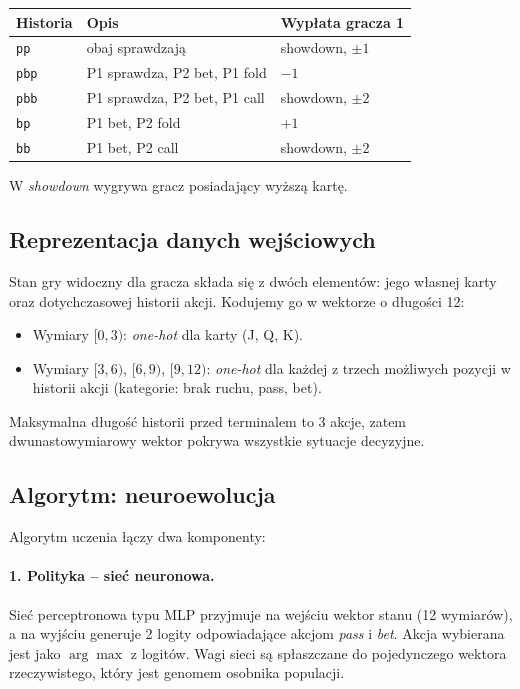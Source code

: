 \documentclass[12pt,a4paper]{article}
\begin{document}
\begin{center}
\begin{tabular}{lll}
\toprule
Historia & Opis & Wypłata gracza 1 \\ \midrule
\texttt{pp}  & obaj sprawdzają        & showdown, $\pm 1$ \\
\texttt{pbp} & P1 sprawdza, P2 bet, P1 fold & $-1$ \\
\texttt{pbb} & P1 sprawdza, P2 bet, P1 call & showdown, $\pm 2$ \\
\texttt{bp}  & P1 bet, P2 fold        & $+1$ \\
\texttt{bb}  & P1 bet, P2 call        & showdown, $\pm 2$ \\
\bottomrule
\end{tabular}
\end{center}

W \emph{showdown} wygrywa gracz posiadający wyższą kartę.

\subsection{Reprezentacja danych wejściowych}
Stan gry widoczny dla gracza składa się z dwóch elementów: jego własnej
karty oraz dotychczasowej historii akcji. Kodujemy go w wektorze o
długości 12:
\begin{itemize}
    \item Wymiary $[0,3)$: \emph{one-hot} dla karty (J, Q, K).
    \item Wymiary $[3,6)$, $[6,9)$, $[9,12)$: \emph{one-hot} dla każdej
          z trzech możliwych pozycji w historii akcji
          (kategorie: brak ruchu, pass, bet).
\end{itemize}
Maksymalna długość historii przed terminalem to 3 akcje, zatem
dwunastowymiarowy wektor pokrywa wszystkie sytuacje decyzyjne.

\subsection{Algorytm: neuroewolucja}
Algorytm uczenia łączy dwa komponenty:

\paragraph{1. Polityka -- sieć neuronowa.}
Sieć perceptronowa typu MLP przyjmuje na wejściu wektor stanu (12
wymiarów), a na wyjściu generuje 2 logity odpowiadające akcjom
\emph{pass} i \emph{bet}. Akcja wybierana jest jako $\arg\max$ z logitów.
Wagi sieci są spłaszczane do pojedynczego wektora rzeczywistego, który
jest genomem osobnika populacji.
\end{document}

